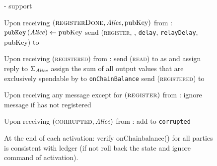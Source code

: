 \begin{figure}[H]
\begin{systembox}{\fpaynet - support}
\begin{algorithmic}[1]
        \State Upon receiving $\left(\textsc{registerDone}, \mathit{Alice},
        \mathrm{pubKey}\right)$ from \simulator:
        \Indent
          \State $\mathtt{pubKey}\left(\mathit{Alice}\right) \gets \mathrm{pubKey}$
          \State send (\textsc{register}, \alice, \texttt{delay},
          \texttt{relayDelay}, pubKey) to \alice
        \EndIndent
        \State

        \State Upon receiving (\textsc{registered}) from \alice:
        \Indent
          \State send (\textsc{read}) to \ledger{} as \alice{} and assign reply
          to $\Sigma_{\mathit{Alice}}$
          \State assign the sum of all output values that are exclusively
          spendable by \alice{} to \texttt{onChainBalance}
          \State send (\textsc{registered}) to \alice
        \EndIndent
        \State

        \State Upon receiving any message except for
        $\left(\textsc{register}\right)$ from \alice:
        \Indent
          \State ignore message if \alice{} has not registered
        \EndIndent
        \State

        \State Upon receiving $\left(\textsc{corrupted}, \mathit{Alice}\right)$ from
        \simulator:
        \Indent
          \State add \alice{} to \texttt{corrupted}
        \EndIndent
        \State

        \State At the end of each activation: 
        \Indent
          \State verify onChainbalance() for all parties is consistent with
          ledger (if not roll back the state and ignore command of activation).
        \EndIndent
      \end{algorithmic}
    \end{systembox}
    \caption{}
    \label{alg:fpaynet:support}
  \end{figure}

